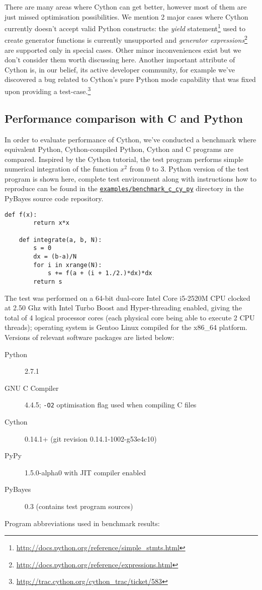 There are many areas where Cython can get better, however most of them are just missed optimisation
possibilities. We mention 2 major cases where Cython currently doesn't accept valid Python constructs:
the \emph{yield} statement\footnote{\url{http://docs.python.org/reference/simple_stmts.html}}
used to create generator functions is currently unsupported and
\emph{generator expressions}\footnote{\url{http://docs.python.org/reference/expressions.html}}
are supported only in special cases. Other minor inconveniences exist but we don't consider them
worth discussing here. Another important attribute of Cython is, in our belief, its active developer
community, for example we've discovered a bug related to Cython's pure Python mode capability that
was fixed upon providing a test-case.\footnote{\url{http://trac.cython.org/cython_trac/ticket/583}}

\subsection{Performance comparison with C and Python} \label{sec:CythonPerformace}

In order to evaluate performance of Cython, we've conducted a benchmark where equivalent Python,
Cython-compiled Python, Cython and C programs are compared. Inspired by the Cython tutorial, the
test program performs simple numerical integration of the function \(x^2\) from 0 to 3. Python
version of the test program is shown here, complete test environment along with instructions how
to reproduce can be found in the
\href{http://github.com/strohel/PyBayes/tree/master/examples/benchmark_c_cy_py}{\nolinkurl{examples/benchmark_c_cy_py}}
directory in the PyBayes source code repository.
\begin{Verbatim}[samepage=true,gobble=1,label=integrate\_python.py,frame=single]
	def f(x):
	    return x*x

	def integrate(a, b, N):
	    s = 0
	    dx = (b-a)/N
	    for i in xrange(N):
	        s += f(a + (i + 1./2.)*dx)*dx
	    return s
\end{Verbatim}
The test was performed on a 64-bit dual-core Intel Core i5-2520M CPU clocked at 2.50 Ghz with Intel Turbo
Boost and Hyper-threading enabled, giving the total of 4 logical processor cores (each physical core
being able to execute 2 CPU threads); operating system is Gentoo Linux compiled for the x86\_64
platform. Versions of relevant software packages are listed below:
\begin{description}
	\item[Python] 2.7.1
	\item[GNU C Compiler] 4.4.5; \verb|-O2| optimisation flag used when compiling C files
	\item[Cython] 0.14.1+ (git revision 0.14.1-1002-g53e4c10)
	\item[PyPy] 1.5.0-alpha0 with JIT compiler enabled
	\item[PyBayes] 0.3 (contains test program sources)
\end{description}
Program abbreviations used in benchmark results:

